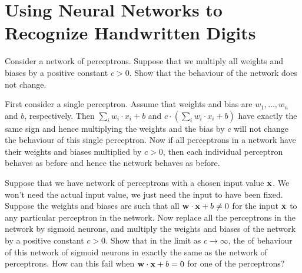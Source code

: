 \chapter{Using Neural Networks to Recognize Handwritten Digits}

\begin{exercise} Consider a network of perceptrons. Suppose that
we multiply all weights and biases by a positive constant $c > 0$. Show 
that the behaviour of the network does not change.
\end{exercise}
\begin{solution}
First consider a single perceptron. Assume that weights and bias are $w_1, \ldots, w_n$ and $b$, respectively. Then $\sum_i w_i \cdot x_i + b$ and 
$c \cdot (\sum_i w_i \cdot x_i + b)$ have exactly the same sign and hence multiplying the weights and the bias by $c$ will not change the behaviour of this single perceptron. Now if all perceptrons in a network have their weights 
and biases multiplied by $c > 0$, then each individual perceptron behaves as before and hence the network behaves as before.
\end{solution}

\begin{exercise}
Suppose that we have network of perceptrons with a chosen input value 
$\mathbf{x}$. We won’t need the actual input value, we just need the input 
to have been fixed. Suppose the weights and biases are such that all 
$\mathbf{w} \cdot \mathbf{x} + b \neq 0$ for the input $\mathbf{x}$ to 
any particular 
perceptron in the network. Now replace all the perceptrons in the network 
by sigmoid neurons, and multiply the weights and biases of the network by 
a positive constant $c > 0$. Show that in the limit as $c \to \infty$, 
the of behaviour of this network of sigmoid neurons in exactly the 
same as the network of perceptrons. How can this fail when 
$\mathbf{w} \cdot \mathbf{x} + b = 0$ for one of the perceptrons?
\end{exercise}
\begin{solution}
\end{solution}
